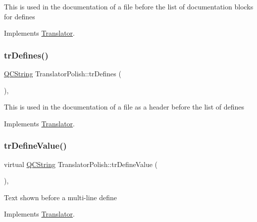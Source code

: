 This is used in the documentation of a file before the list of documentation blocks for defines 

Implements \mbox{\hyperlink{class_translator}{Translator}}.

\mbox{\label{class_translator_polish_aa4a9ddef7581b29a7640e519b86b4774}} 
\subsubsection{\texorpdfstring{trDefines()}{trDefines()}}
{\footnotesize\ttfamily \mbox{\hyperlink{class_q_c_string}{Q\+C\+String}} Translator\+Polish\+::tr\+Defines (\begin{DoxyParamCaption}{ }\end{DoxyParamCaption})\hspace{0.3cm}{\ttfamily [inline]}, {\ttfamily [virtual]}}

This is used in the documentation of a file as a header before the list of defines 

Implements \mbox{\hyperlink{class_translator}{Translator}}.

\mbox{\label{class_translator_polish_ae13b5d65dbff36936d3acc4a07adb90a}} 
\subsubsection{\texorpdfstring{trDefineValue()}{trDefineValue()}}
{\footnotesize\ttfamily virtual \mbox{\hyperlink{class_q_c_string}{Q\+C\+String}} Translator\+Polish\+::tr\+Define\+Value (\begin{DoxyParamCaption}{ }\end{DoxyParamCaption})\hspace{0.3cm}{\ttfamily [inline]}, {\ttfamily [virtual]}}

Text shown before a multi-\/line define 

Implements \mbox{\hyperlink{class_translator}{Translator}}.

\mbox{\label{class_translator_polish_a3a930e05e40b606dffdab1ab7c25d3e8}} 
